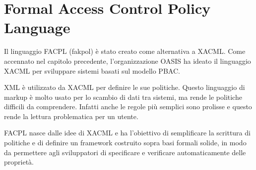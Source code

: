 \chapter{Formal Access Control Policy Language }
\label{chap:Formal Access Control Policy Language}
Il linguaggio FACPL (fakpol) è stato creato come alternativa a XACML. Come accennato nel capitolo precedente,
l'organizzazione OASIS ha ideato il linguaggio XACML per sviluppare sistemi basati sul modello PBAC.\par
XML è utilizzato da XACML per definire le sue politiche. Questo linguaggio di markup è molto usato per lo scambio
di dati tra sistemi, ma rende le politiche difficili da comprendere. Infatti anche le regole più semplici sono prolisse
e questo rende la lettura problematica per un utente.\par
FACPL nasce dalle idee di XACML e ha l'obiettivo di semplificare la scrittura di politiche e di definire un framework
costruito sopra basi formali solide, in modo da permettere agli sviluppatori di specificare e verificare automaticamente
delle proprietà.

